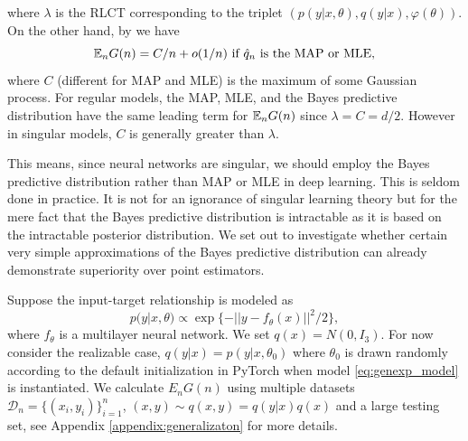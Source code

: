 \documentclass{article} %
\begin{document}
where $\lambda$ is the RLCT corresponding to the triplet $( p(y|x,\theta), q(y|x), \varphi(\theta) )$.
On the other hand, by {\cite[Theorem 6.4]{watanabe_algebraic_2009}} we have
\begin{equation}
{\mathbb{E}}_n G(n) = C/n + o(1/n)   \text{ if $\hat q_n$ is the MAP or MLE,}
\label{eq:map_generalization}
\end{equation}
where $C$ (different for MAP and MLE) is the maximum of some Gaussian process. For regular models, the MAP, MLE, and the Bayes predictive distribution have the same leading term for ${\mathbb{E}}_n G(n)$ since $\lambda = C = d/2$. However in singular models, $C$ is generally greater than $\lambda$. 

This means, since neural networks are singular, we should employ the Bayes predictive distribution rather than MAP or MLE in deep learning. This is seldom done in practice. It is not for an ignorance of singular learning theory but for the mere fact that the Bayes predictive distribution is intractable as it is based on the intractable posterior distribution. 
We set out to investigate whether certain very simple approximations of the Bayes predictive distribution can already demonstrate superiority over point estimators. 

Suppose the input-target relationship is modeled as
\begin{equation}
p(y|x,\theta) \propto \exp\{-|| y - f_\theta(x) ||^2/2\},
\label{eq:genexp_model}
\end{equation}
where $f_\theta$ is a multilayer neural network.
We set $q(x) = N(0,I_3)$. 
For now consider the realizable case, $q(y|x) = p(y|x,\theta_0)$ where $\theta_0$ is drawn randomly according to the default initialization in PyTorch when model \ref{eq:genexp_model} is instantiated. We calculate $E_n G(n)$ using multiple datasets $\mathcal D_n = \{(x_i,y_i)\}_{i=1}^n$, $(x,y) \sim q(x,y) = q(y|x)q(x)$ and a large testing set, see Appendix \ref{appendix:generalizaton} for more details. 
\end{document}
